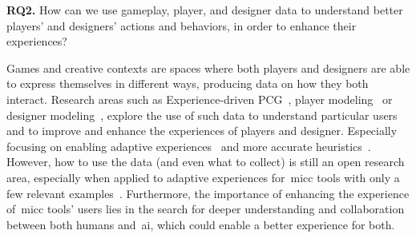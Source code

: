 \begin{retQuestion}{}
   \textbf{RQ2.} How can we use gameplay, player, and designer data to understand better players' and designers' actions and behaviors, in order to enhance their experiences?
\end{retQuestion}

Games and creative contexts are spaces where both players and designers are able to express themselves in different ways, producing data on how they both interact. Research areas such as Experience-driven PCG~\cite{Yannakakis2011-experiencedrivenPCG}, player modeling~\cite{Pedersen2010-modelingPlayerExp,Holmgard2019-proceduralPersonas} or designer modeling~\cite{Liapis2013-designerModel}, explore the use of such data to understand particular users~\cite{Liapis2013-designerModel,Drachen2009-playerModellingTombRaider,Melhart2019-ModellingMotivation} and to improve and enhance the experiences of players and designer. Especially focusing on enabling adaptive experiences~\cite{hastings_evolving_2009} and more accurate heuristics~\cite{Marinho2015-empiricalEvaluation,canossa2015-towardspcgEvaluation,summerville2017-understandingMario}. However, how to use the data (and even what to collect) is still an open research area, especially when applied to adaptive experiences for~\acrshort{micc} tools with only a few relevant examples~\cite{Liapis2014-designerModelImpl,Liapis2012-adaptiveVisual}. Furthermore, the importance of enhancing the experience of~\acrshort{micc} tools' users lies in the search for deeper understanding and collaboration between both humans and~\acrshort{ai}, which could enable a better experience for both.


